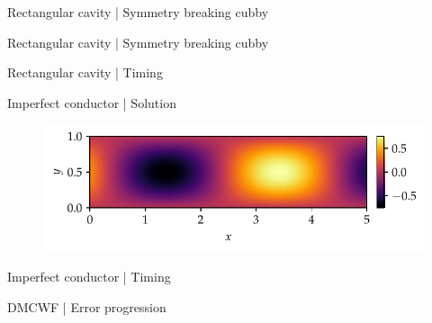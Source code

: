 \documentclass{beamer}
\begin{document}
\begin{frame}{Rectangular cavity | Symmetry breaking cubby}
    \begin{figure}
        \centering
        \scalebox{0.8}{}
    \end{figure}
\end{frame}

\begin{frame}{Rectangular cavity | Symmetry breaking cubby}
    \begin{figure}
        \centering
        \scalebox{0.8}{}
    \end{figure}
\end{frame}

\begin{frame}{Rectangular cavity | Timing}
    \begin{table}
        \centering
        \scalebox{0.8}{}
    \end{table}
\end{frame}

\begin{frame}{Imperfect conductor | Solution}
    \begin{figure}
        \centering
        \includegraphics[scale=0.8]{../report/plots/imperfect_conductor_solution.pdf}
    \end{figure}
\end{frame}

\begin{frame}{Imperfect conductor | Timing}
    \begin{table}
        \centering
        \scalebox{0.8}{}
    \end{table}
\end{frame}

\begin{frame}{DMCWF | Error progression}
    \begin{figure}
        \centering
        \scalebox{0.6}{}
    \end{figure}
\end{frame}
\end{document}
